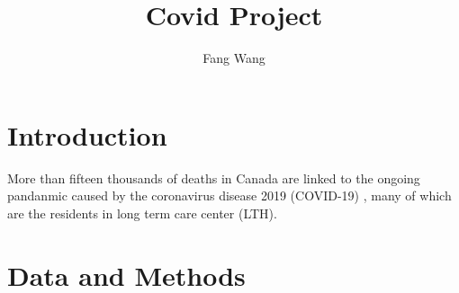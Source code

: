 \documentclass{report}
\author{Fang Wang}
\title{ \textbf{\huge{Covid Project}}}
\begin{document}
\newcommand{\RR}{\mathbb{R}}
\newcommand{\ZZ}{\mathbb{Z}}
\newcommand{\NN}{\mathbb{N}}
\newcommand{\QQ}{\mathbb{Q}}
\newcommand{\CC}{\mathbb{C}}
\newcommand{\e}{\mathrm{e}}
\newcommand{\sumi}[2][1]{\sum\limits_{i=#1}^{#2}}
\newcommand{\sumk}[2][1]{\sum\limits_{k=#1}^{#2}}
\newcommand{\sumj}[2][1]{\sum\limits_{j=#1}^{#2}}
\newcommand{\sumx}[2][1]{\sum\limits_{x=#1}^{#2}}
\newcommand{\sumn}[2][1]{\sum\limits_{n=#1}^{#2}}
\newcommand{\prodi}[2][1]{\prod\limits_{i=#1}^{#2}}
\newcommand{\prodk}[2][1]{\prod\limits_{k=#1}^{#2}}
\newcommand{\prodj}[2][1]{\prod\limits_{j=#1}^{#2}}
\newcommand{\E}[2][]{ \mathbb{E}_{#1} \left[ #2 \right]}
\newcommand{\Var}[1]{ \mathrm{Var} \left[ #1 \right]}
\newcommand{\Cov}[1]{ \mathrm{Cov} \left[ #1 \right]}
\renewcommand{\P}[2][]{ \mathbb{P}_{#1} \left( #2 \right)}
\newcommand{\iidis}{\stackrel{iid}{\sim}}
\newcommand{\toP}{\stackrel{P}{\to}}
\newcommand{\toD}{\stackrel{\mathrm{D}}{\to}}
\newcommand{\eqD}{\stackrel{\mathrm{D}}{=}}
\newcommand{\toas}{\stackrel{\mathrm{a.s}}{\to}}
\newcommand{\I}[1]{\mathbb 1_{\{#1\}}}
\newtheorem{thm}{Theorem}[chapter]
\newtheorem{prop}{Proposition}[chapter]
\newtheorem{lem}{Lemma}[chapter]
\newtheorem{cor}{Corollary}[chapter]

\theoremstyle{definition}
\newtheorem{defn}{Definition}[chapter]
\newtheorem{eg}{Example}[chapter]

\theoremstyle{remark}
\newtheorem*{rem}{Remark}
\maketitle

\chapter{Introduction} \label{chapter intro}

More than fifteen thousands of deaths in Canada are linked to the ongoing pandanmic caused by the coronavirus disease 2019 (COVID-19) \cite{dong2020interactive}, many of which are the residents
in long term care center (LTH). 



\chapter{Data and Methods} \label{chapter methods}







\end{document}

